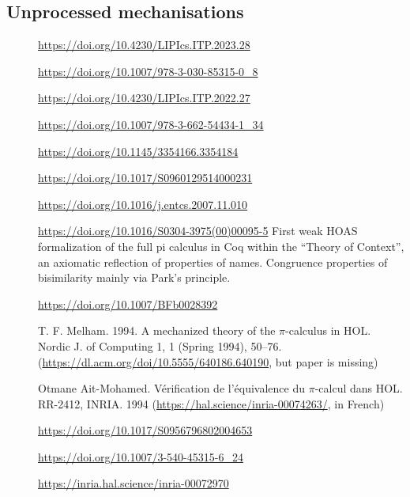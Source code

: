 \subsection{Unprocessed mechanisations}
\begin{description}
\item[\cite{Tirore:2023}]                 \url{https://doi.org/10.4230/LIPIcs.ITP.2023.28}
\item[\cite{Cruz-Filipe2021}]             \url{https://doi.org/10.1007/978-3-030-85315-0_8}
\item[\cite{Pohjola2022}]                 \url{https://doi.org/10.4230/LIPIcs.ITP.2022.27}
\item[\cite{Tassarotti2017}]              \url{https://doi.org/10.1007/978-3-662-54434-1_34}
\item[\cite{Thiemann2019}]                \url{https://doi.org/10.1145/3354166.3354184}
\item[\cite{Goto2016}]                    \url{https://doi.org/10.1017/S0960129514000231}
\item[\cite{Affeldt2008}]                 \url{https://doi.org/10.1016/j.entcs.2007.11.010}
\item[\cite{Honsell2001}]
  \url{https://doi.org/10.1016/S0304-3975(00)00095-5} First weak HOAS
  formalization of the full pi calculus in Coq within the ``Theory of
  Context'', an axiomatic reflection of properties of
  names. Congruence properties of bisimilarity mainly via Park's
  principle.
\item[\cite{Hirschkoff1997}]              \url{https://doi.org/10.1007/BFb0028392}
\item[\cite{Melham1994}]                  T. F. Melham. 1994. A mechanized theory of the $\pi$-calculus in HOL. Nordic J. of Computing 1, 1 (Spring 1994), 50–76. (\url{https://dl.acm.org/doi/10.5555/640186.640190}, but paper is missing)
\item[\cite{Ait-Mohamed1994}]             Otmane Ait-Mohamed. Vérification de l'équivalence du $\pi$-calcul dans HOL. RR-2412, INRIA. 1994 (\url{https://hal.science/inria-00074263/}, in French)
\item[\cite{Rockl2003}]                   \url{https://doi.org/10.1017/S0956796802004653}
\item[\cite{Rockl2001}]                   \url{https://doi.org/10.1007/3-540-45315-6_24}
\item[\cite{Henry-Greard1999}]            \url{https://inria.hal.science/inria-00072970}

\end{description}

